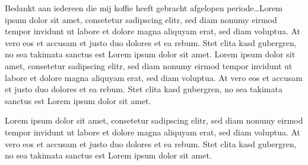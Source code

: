 \documentclass[
11pt, %
english, %
singlespacing, %
liststotoc, %
headsepline, %
]{formatting} %
\begin{document}
\begin{voorwoord}
\addchaptertocentry{\voorwoordname}
Bedankt aan iedereen die mij koffie heeft gebracht afgelopen periode\ldots Lorem ipsum dolor sit amet, consetetur sadipscing elitr, sed diam nonumy eirmod tempor invidunt ut labore et dolore magna aliquyam erat, sed diam voluptua. At vero eos et accusam et justo duo dolores et ea rebum. Stet clita kasd gubergren, no sea takimata sanctus est Lorem ipsum dolor sit amet. Lorem ipsum dolor sit amet, consetetur sadipscing elitr, sed diam nonumy eirmod tempor invidunt ut labore et dolore magna aliquyam erat, sed diam voluptua. At vero eos et accusam et justo duo dolores et ea rebum. Stet clita kasd gubergren, no sea takimata sanctus est Lorem ipsum dolor sit amet. 

Lorem ipsum dolor sit amet, consetetur sadipscing elitr, sed diam nonumy eirmod tempor invidunt ut labore et dolore magna aliquyam erat, sed diam voluptua. At vero eos et accusam et justo duo dolores et ea rebum. Stet clita kasd gubergren, no sea takimata sanctus est Lorem ipsum dolor sit amet.
\end{voorwoord}


\renewcommand{\contentsname}{Inhoud}
\tableofcontents %

\renewcommand{\listfigurename}{Figurenlijst}
\listoffigures %

\renewcommand{\listtablename}{Tabellenlijst}
\listoftables %
\end{document}
